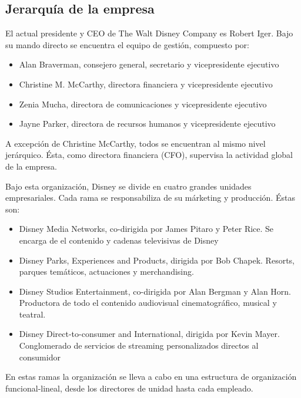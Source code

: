 \subsection{Jerarquía de la empresa}
El actual presidente y CEO de The Walt Disney Company es Robert Iger. Bajo su mando directo se encuentra el equipo de gestión, compuesto por:
\begin{itemize}

\item
Alan Braverman, consejero general, secretario y vicepresidente ejecutivo

\item
Christine M. McCarthy, directora financiera y vicepresidente ejecutivo

\item
Zenia Mucha, directora de comunicaciones y vicepresidente ejecutivo

\item
Jayne Parker, directora de recursos humanos y vicepresidente ejecutivo

\end{itemize}

A excepción de Christine McCarthy, todos se encuentran al mismo nivel jerárquico. Ésta,  como directora financiera (CFO), supervisa la actividad global de la empresa.

Bajo esta organización, Disney se divide en cuatro grandes unidades empresariales. Cada rama se responsabiliza de su márketing y producción. Éstas son:
\begin{itemize}
\item
Disney Media Networks, co-dirigida por James Pitaro y Peter Rice. Se encarga de el contenido y cadenas televisivas de Disney

\item
Disney Parks, Experiences and Products, dirigida por Bob Chapek. Resorts, parques temáticos, actuaciones y merchandising.

\item
Disney Studios Entertainment, co-dirigida por Alan Bergman y Alan Horn. Productora de todo el contenido audiovisual cinematográfico, musical y teatral.

\item
Disney Direct-to-consumer and International, dirigida por Kevin Mayer. Conglomerado de servicios de streaming personalizados directos al consumidor

\end{itemize}

En estas ramas la organización se lleva a cabo en una estructura de organización funcional-lineal, desde los directores de unidad hasta cada empleado. 

